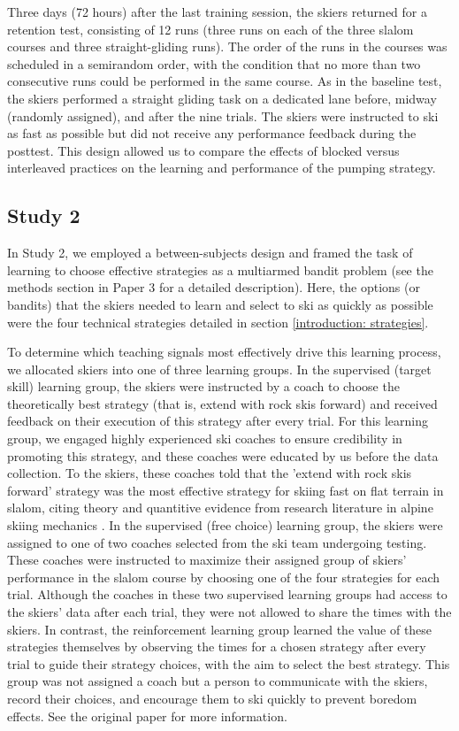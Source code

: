 Three days (72 hours) after the last training session, the skiers returned for a retention test, consisting of 12 runs (three runs on each of the three slalom courses and three straight-gliding runs). The order of the runs in the courses was scheduled in a semirandom order, with the condition that no more than two consecutive runs could be performed in the same course. As in the baseline test, the skiers performed a straight gliding task on a dedicated lane before, midway (randomly assigned), and after the nine trials. The skiers were instructed to ski as fast as possible but did not receive any performance feedback during the posttest. This design allowed us to compare the effects of blocked versus interleaved practices on the learning and performance of the pumping strategy. 


 \subsection{Study 2}
In Study 2, we employed a between-subjects design and framed the task of learning to choose effective strategies as a multiarmed bandit problem\cite{sutton_reinforcement_2018} (see the methods section in Paper 3 for a detailed description). Here, the options (or bandits) that the skiers needed to learn and select to ski as quickly as possible were the four technical strategies detailed in section \ref{introduction: strategies}.

To determine which teaching signals most effectively drive this learning process, we allocated skiers into one of three learning groups. In the supervised (target skill) learning group, the skiers were instructed by a coach to choose the theoretically best strategy (that is, extend with rock skis forward) and received feedback on their execution of this strategy after every trial. For this learning group, we engaged highly experienced ski coaches to ensure credibility in promoting this strategy, and these coaches were educated by us before the data collection. To the skiers, these coaches told that the 'extend with rock skis forward’ strategy was the most effective strategy for skiing fast on flat terrain in slalom, citing theory and quantitive evidence from research literature in alpine skiing mechanics \cite{reid_kinematic_2010, mote_accelerations_1983, lind_physics_2013, lemaster_skiers_1999, lemaster_ultimate_2010}. In the supervised (free choice) learning group, the skiers were assigned to one of two coaches selected from the ski team undergoing testing. These coaches were instructed to maximize their assigned group of skiers' performance in the slalom course by choosing one of the four strategies for each trial. Although the coaches in these two supervised learning groups had access to the skiers’ data after each trial, they were not allowed to share the times with the skiers. In contrast, the reinforcement learning group learned the value of these strategies themselves by observing the times for a chosen strategy after every trial to guide their strategy choices, with the aim to select the best strategy. This group was not assigned a coach but a person to communicate with the skiers, record their choices, and encourage them to ski quickly to prevent boredom effects. See the original paper for more information.

